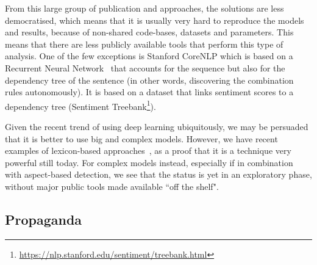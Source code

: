 
From this large group of publication and approaches, the solutions are less democratised, which means that it is usually very hard to reproduce the models and results, because of non-shared code-bases, datasets and parameters.
This means that there are less publicly available tools that perform this type of analysis.
One of the few exceptions is Stanford CoreNLP which is based on a Recurrent Neural Network~\citep{socher2013recursive} that accounts for the sequence but also for the dependency tree of the sentence (in other words, discovering the combination rules autonomously). It is based on a dataset that links sentiment scores to a dependency tree (Sentiment Treebank\footnote{\url{https://nlp.stanford.edu/sentiment/treebank.html}}).

Given the recent trend of using deep learning ubiquitously, we may be persuaded that it is better to use big and complex models.
However, we have recent examples of lexicon-based approaches~\citep{okango2022dictionary,mitra2020sentiment}, as a proof that it is a technique very powerful still today.
For complex models instead, especially if in combination with aspect-based detection, we see that the status is yet in an exploratory phase, without major public tools made available ``off the shelf".

\subsection{\statusgreen Propaganda}
\label{sec:lit_propaganda}

